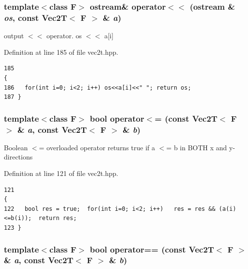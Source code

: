 \subsubsection{\setlength{\rightskip}{0pt plus 5cm}template$<$class F$>$ ostream\& operator$<$$<$ (ostream \& {\em os}, const {\bf Vec2T}$<$ F $>$ \& {\em a})}\label{vec2t_8hpp_10dd31351eb0bcde6d20f2137d176476_10dd31351eb0bcde6d20f2137d176476}


output $<$$<$ operator. os $<$$<$ a[i] 

Definition at line 185 of file vec2t.hpp.

\footnotesize\begin{verbatim}185                                                                        { 
186   for(int i=0; i<2; i++) os<<a[i]<<" "; return os;
187 }
\end{verbatim}\normalsize 


\subsubsection{\setlength{\rightskip}{0pt plus 5cm}template$<$class F$>$ bool operator$<$= (const {\bf Vec2T}$<$ F $>$ \& {\em a}, const {\bf Vec2T}$<$ F $>$ \& {\em b})\hspace{0.3cm}{\tt  [inline]}}\label{vec2t_8hpp_54b74e0e2f8e7609979e6db862b84ccc_54b74e0e2f8e7609979e6db862b84ccc}


Boolean $<$= overloaded operator returns true if a $<$= b in BOTH x and y-directions 

Definition at line 121 of file vec2t.hpp.

\footnotesize\begin{verbatim}121                                                                                 {
122   bool res = true;  for(int i=0; i<2; i++)   res = res && (a(i)<=b(i));  return res; 
123 }
\end{verbatim}\normalsize 


\subsubsection{\setlength{\rightskip}{0pt plus 5cm}template$<$class F$>$ bool operator== (const {\bf Vec2T}$<$ F $>$ \& {\em a}, const {\bf Vec2T}$<$ F $>$ \& {\em b})\hspace{0.3cm}{\tt  [inline]}}\label{vec2t_8hpp_c45246915408da62bc1cdebc87f013b5_c45246915408da62bc1cdebc87f013b5}



